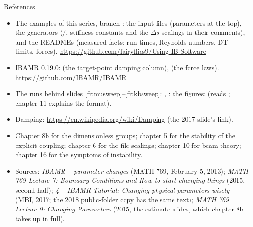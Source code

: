 \documentclass[aspectratio=169,11pt]{beamer}
\begin{document}
\begin{frame}{References}
\label{fr:refs}
\scriptsize
\begin{itemize}
  \item The examples of this series, branch : the input files (parameters at the top), the generators (/, stiffness constants and the $\Delta s$ scalings in their comments), and the READMEs (measured facts: run times, Reynolds numbers, DT limits, forces). \url{https://github.com/fairyflies9/Using-IB-Software}
  \item IBAMR 0.19.0:  (the target-point damping column),  (the force laws). \url{https://github.com/IBAMR/IBAMR}
  \item The runs behind slides \ref{fr:musweep}--\ref{fr:kbsweep}: , ; the figures:  (reads ; chapter 11 explains the format).
  \item Damping: \url{https://en.wikipedia.org/wiki/Damping} (the 2017 slide's link).
  \item Chapter 8b for the dimensionless groups; chapter 5 for the stability of the explicit coupling; chapter 6 for the file scalings; chapter 10 for beam theory; chapter 16 for the symptoms of instability.
  \item Sources: \emph{IBAMR -- parameter changes} (MATH 769, February 5, 2013); \emph{MATH 769 Lecture 7: Boundary Conditions and How to start changing things} (2015, second half); \emph{4 -- IBAMR Tutorial: Changing physical parameters wisely} (MBI, 2017; the 2018 public-folder copy has the same text); \emph{MATH 769 Lecture 9: Changing Parameters} (2015, the estimate slides, which chapter 8b takes up in full).
\end{itemize}
\end{frame}
\end{document}
